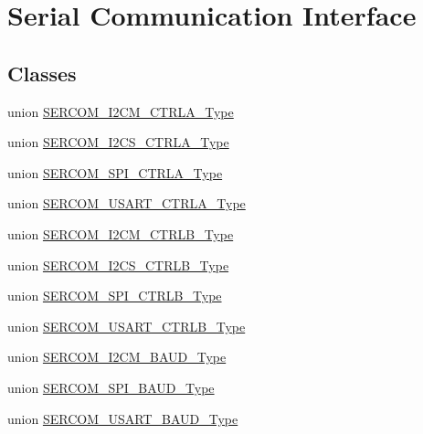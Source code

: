 \hypertarget{group___s_a_m_l21___s_e_r_c_o_m}{}\section{Serial Communication Interface}
\label{group___s_a_m_l21___s_e_r_c_o_m}
\subsection*{Classes}
\begin{DoxyCompactItemize}
\item 
union \hyperlink{union_s_e_r_c_o_m___i2_c_m___c_t_r_l_a___type}{S\+E\+R\+C\+O\+M\+\_\+\+I2\+C\+M\+\_\+\+C\+T\+R\+L\+A\+\_\+\+Type}
\item 
union \hyperlink{union_s_e_r_c_o_m___i2_c_s___c_t_r_l_a___type}{S\+E\+R\+C\+O\+M\+\_\+\+I2\+C\+S\+\_\+\+C\+T\+R\+L\+A\+\_\+\+Type}
\item 
union \hyperlink{union_s_e_r_c_o_m___s_p_i___c_t_r_l_a___type}{S\+E\+R\+C\+O\+M\+\_\+\+S\+P\+I\+\_\+\+C\+T\+R\+L\+A\+\_\+\+Type}
\item 
union \hyperlink{union_s_e_r_c_o_m___u_s_a_r_t___c_t_r_l_a___type}{S\+E\+R\+C\+O\+M\+\_\+\+U\+S\+A\+R\+T\+\_\+\+C\+T\+R\+L\+A\+\_\+\+Type}
\item 
union \hyperlink{union_s_e_r_c_o_m___i2_c_m___c_t_r_l_b___type}{S\+E\+R\+C\+O\+M\+\_\+\+I2\+C\+M\+\_\+\+C\+T\+R\+L\+B\+\_\+\+Type}
\item 
union \hyperlink{union_s_e_r_c_o_m___i2_c_s___c_t_r_l_b___type}{S\+E\+R\+C\+O\+M\+\_\+\+I2\+C\+S\+\_\+\+C\+T\+R\+L\+B\+\_\+\+Type}
\item 
union \hyperlink{union_s_e_r_c_o_m___s_p_i___c_t_r_l_b___type}{S\+E\+R\+C\+O\+M\+\_\+\+S\+P\+I\+\_\+\+C\+T\+R\+L\+B\+\_\+\+Type}
\item 
union \hyperlink{union_s_e_r_c_o_m___u_s_a_r_t___c_t_r_l_b___type}{S\+E\+R\+C\+O\+M\+\_\+\+U\+S\+A\+R\+T\+\_\+\+C\+T\+R\+L\+B\+\_\+\+Type}
\item 
union \hyperlink{union_s_e_r_c_o_m___i2_c_m___b_a_u_d___type}{S\+E\+R\+C\+O\+M\+\_\+\+I2\+C\+M\+\_\+\+B\+A\+U\+D\+\_\+\+Type}
\item 
union \hyperlink{union_s_e_r_c_o_m___s_p_i___b_a_u_d___type}{S\+E\+R\+C\+O\+M\+\_\+\+S\+P\+I\+\_\+\+B\+A\+U\+D\+\_\+\+Type}
\item 
union \hyperlink{union_s_e_r_c_o_m___u_s_a_r_t___b_a_u_d___type}{S\+E\+R\+C\+O\+M\+\_\+\+U\+S\+A\+R\+T\+\_\+\+B\+A\+U\+D\+\_\+\+Type}
\item 

\end{DoxyCompactItemize}
